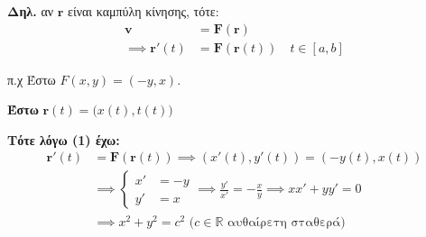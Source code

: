 \documentclass[11pt,a4paper,titlepage,draft]{article}
\begin{document}
\textbf{Δηλ.} αν $\mathbf r$ είναι καμπύλη κίνησης, τότε:
\begin{align*}
\mathbf{v} &= \mathbf{F}(\mathbf r)
\\ \implies
\mathbf{r}'(t) &= \mathbf{F} \left(
\mathbf r(t)
\right) \quad t \in [a,b]
\end{align*}

π.χ Έστω $F(x,y) = (-y,x)$.

\textbf{Έστω} $\mathbf{r}(t) = \Big(x(t), t(t) \Big)$

\textbf{Τότε λόγω (1) έχω:}
\begin{align*}
\mathbf{r}'(t) &= \mathbf{F}\left(
\mathbf r(t)
\right) \implies
\left(
x'(t),y'(t) \right) = \left(
-y(t),x(t)
\right) \\
&\implies \begin{cases}
x' &= -y\\
y' &= x
\end{cases}
\implies \frac{y'}{x'} = -\frac{x}{y} \implies xx'+yy' = 0
\\ &\implies \boxed{x^2+y^2=c^2} \text{ ($c \in \mathbb{R}$ αυθαίρετη σταθερά)}
\end{align*}
\end{document}
